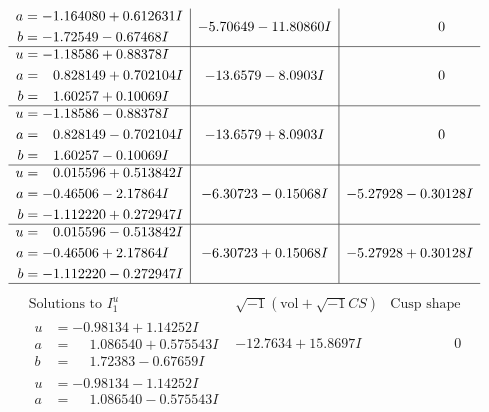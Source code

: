 \documentclass[1p]{elsarticle_modified}
\theoremstyle{definition}
\newcommand{\I}{\sqrt{-1}}
\begin{document}
$$\begin{array}{c|c|c}
\begin{aligned}
a &= -1.164080 + 0.612631 I \\
b &= -1.72549 - 0.67468 I\end{aligned}
 & -5.70649 - 11.80860 I & \phantom{-0.000000 } 0 \\ \hline\begin{aligned}
u &= -1.18586 + 0.88378 I \\
a &= \phantom{-}0.828149 + 0.702104 I \\
b &= \phantom{-}1.60257 + 0.10069 I\end{aligned}
 & -13.6579 - 8.0903 I & \phantom{-0.000000 } 0 \\ \hline\begin{aligned}
u &= -1.18586 - 0.88378 I \\
a &= \phantom{-}0.828149 - 0.702104 I \\
b &= \phantom{-}1.60257 - 0.10069 I\end{aligned}
 & -13.6579 + 8.0903 I & \phantom{-0.000000 } 0 \\ \hline\begin{aligned}
u &= \phantom{-}0.015596 + 0.513842 I \\
a &= -0.46506 - 2.17864 I \\
b &= -1.112220 + 0.272947 I\end{aligned}
 & -6.30723 - 0.15068 I & -5.27928 - 0.30128 I \\ \hline\begin{aligned}
u &= \phantom{-}0.015596 - 0.513842 I \\
a &= -0.46506 + 2.17864 I \\
b &= -1.112220 - 0.272947 I\end{aligned}
 & -6.30723 + 0.15068 I & -5.27928 + 0.30128 I\\
 \hline 
 \end{array}$$\newpage$$\begin{array}{c|c|c}  
\text{Solutions to }I^u_{1}& \I (\text{vol} + \sqrt{-1}CS) & \text{Cusp shape}\\
 \hline 
\begin{aligned}
u &= -0.98134 + 1.14252 I \\
a &= \phantom{-}1.086540 + 0.575543 I \\
b &= \phantom{-}1.72383 - 0.67659 I\end{aligned}
 & -12.7634 + 15.8697 I & \phantom{-0.000000 } 0 \\ \hline\begin{aligned}
u &= -0.98134 - 1.14252 I \\
a &= \phantom{-}1.086540 - 0.575543 I \\

\end{aligned}
\end{array}$$
\end{document}
